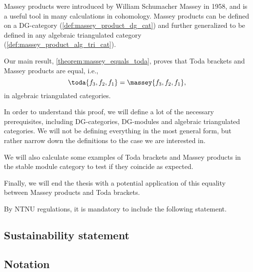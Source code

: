 Massey products were introduced by William Schumacher Massey in 1958, and is a useful tool in many calculations in cohomology. Massey products can be defined on a DG-category (\autoref{def:massey_product_dg_cat}) and further generalized to be defined in any algebraic triangulated category (\autoref{def:massey_product_alg_tri_cat}).

Our main result, \autoref{theorem:massey_equals_toda}, proves that Toda brackets and Massey products are equal, i.e.,
\[
    \toda{f_3, f_2, f_1} = \massey{f_3, f_2, f_1},
\]
in algebraic triangulated categories.

In order to understand this proof, we will define a lot of the necessary prerequisites, including DG-categories, DG-modules and algebraic triangulated categories. We will not be defining everything in the most general form, but rather narrow down the definitions to the case we are interested in.

We will also calculate some examples of Toda brackets and Massey products in the stable module category to test if they coincide as expected.

Finally, we will end the thesis with a potential application of this equality between Massey products and Toda brackets.

By NTNU regulations, it is mandatory to include the following statement.
\subsection{Sustainability statement}


\subsection{Notation}
